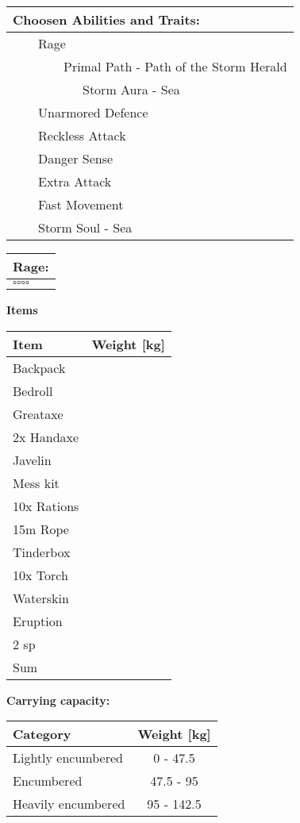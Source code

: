 \documentclass[11pt]{article}
\newcommand{\available}{$\square$}
\newcommand{\tabitem}{~~\llap{--}~~}
\newcommand{\tabtabitem}{~~~~~~\llap{$\bullet$}~~}
\newcommand{\tabtabtabitem}{~~~~~~~~~\llap{$\star$}~~}
\begin{document}
\begin{multicols}{2}
\vspace{4mm}

\noindent \begin{tabularx}{95mm}{@{}l}
{\Large \textbf{Choosen Abilities and Traits:}} \\
\hline
\tabitem Rage \\
\tabtabitem Primal Path - Path of the Storm Herald \\
\tabtabtabitem Storm Aura - Sea \\
\tabitem Unarmored Defence \\
\tabitem Reckless Attack \\
\tabitem Danger Sense \\
\tabitem Extra Attack \\
\tabitem Fast Movement \\
\tabitem Storm Soul - Sea
		\end{tabularx}

\vspace{4mm}

\noindent \begin{tabularx}{95mm}{@{}l}
{\Large \textbf{Rage:}} \\
\hline
\available \available \available \available
		\end{tabularx}
	\end{multicols}

\clearpage

	\begin{center}
{\LARGE \textbf{Items}}
	\end{center}

	\begin{tabularx}{\textwidth}{X|r}
Item & Weight [kg] \\
\hline
Backpack									&			\\
Bedroll										&			\\
Greataxe									&			\\
2x Handaxe									&			\\
Javelin										&			\\
Mess kit									&			\\
10x Rations									&			\\
15m Rope									&			\\
Tinderbox									&			\\
10x Torch									&			\\
Waterskin									&			\\
Eruption									&			\\
2 sp					 					& 			\\
\hline
Sum 										&
	\end{tabularx}

\vspace{10mm}

\textbf{Carrying capacity:} \\

	\begin{tabular}{l|c}
Category & Weight [kg] \\
\hline
Lightly encumbered 	& 0 - 47.5 	\\
Encumbered 			& 47.5 - 95 \\
Heavily encumbered	& 95 - 142.5
	\end{tabular}
\end{document}
